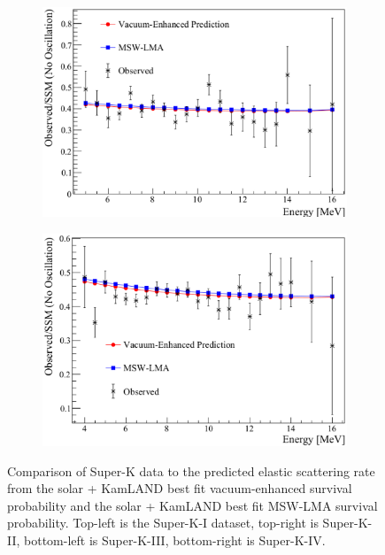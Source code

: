 \begin{figure}[htbp]
\begin{subfigure}[b]{0.48\textwidth}
    \centering
    \includegraphics[width=\textwidth]{kamland_superk_3}
    \caption[]{}
  \end{subfigure}
  \hfill
\begin{subfigure}[b]{0.48\textwidth}
    \centering
    \includegraphics[width=\textwidth]{kamland_superk_4}
    \caption[]{}
  \end{subfigure}
  \caption[Super-K Fit Comparison for Solar + KamLAND Best Fit Vacuum-Enhanced Mixing and MSW-LMA Mixing]{
  Comparison of Super-K data to the predicted elastic scattering rate from the
  solar + KamLAND best fit vacuum-enhanced survival probability
and the solar + KamLAND best fit MSW-LMA survival probability.
Top-left is the Super-K-I dataset, top-right is Super-K-II, bottom-left is Super-K-III,
bottom-right is Super-K-IV.}
  \label{fig:solar_kamland_sk}
\end{figure}

